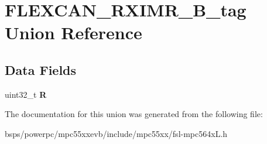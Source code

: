 \hypertarget{unionFLEXCAN__RXIMR__32B__tag}{}\section{F\+L\+E\+X\+C\+A\+N\+\_\+\+R\+X\+I\+M\+R\+\_\+B\+\_\+tag Union Reference}
\label{unionFLEXCAN__RXIMR__32B__tag}
\subsection*{Data Fields}
\begin{DoxyCompactItemize}
\item 
\mbox{\label{unionFLEXCAN__RXIMR__32B__tag_aa1b06fc769f196f1ca9460680819362e}} 
uint32\+\_\+t {\bfseries R}
\end{DoxyCompactItemize}


The documentation for this union was generated from the following file\+:\begin{DoxyCompactItemize}
\item 
bsps/powerpc/mpc55xxevb/include/mpc55xx/fsl-\/mpc564x\+L.\+h\end{DoxyCompactItemize}
